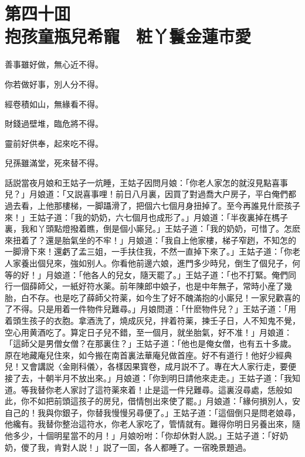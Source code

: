 
\chapter*{第四十囬　\\抱孩童瓶兒希寵　粧丫鬟金蓮市愛}
\thispagestyle{empty}

\begin{myquote}
善事雖好做，無心近不得。

你若做好事，別人分不得。

經卷積如山，無緣看不得。

財錢過壁堆，臨危將不得。

靈前好供奉，起來吃不得。

兒孫雖滿堂，死來替不得。
\end{myquote}

話説當夜月娘和王姑子一炕睡，王姑子因問月娘：「你老人家怎的就沒見點喜事兒？」月娘道：「又説喜事哩！前日八月裏，因買了對過喬大户房子，平白俺們都過去看，上他那樓梯，一脚躡滑了，把個六七個月身扭掉了。至今再誰見什麽孩子來！」王姑子道：「我的奶奶，六七個月也成形了。」月娘道：「半夜裏掉在榪子裏，我和丫頭點燈撥着瞧，倒是個小廝兒。」王姑子道：「我的奶奶，可惜了。怎麽來扭着了？還是胎氣坐的不牢！」月娘道：「我自上他家樓，梯子窄趔，不知怎的一脚滑下來！還虧了孟三姐，一手扶住我，不然一直掉下來了。」王姑子道：「你老人家養出個兒來，強如别人。你看他前邊六娘，進門多少時兒，倒生了個兒子，何等的好！」月娘道：「他各人的兒女，隨天罷了。」王姑子道：「也不打緊。俺們同行一個薛師父，一紙好符水薬。前年陳郎中娘子，也是中年無子，常時小産了幾胎，白不存。也是吃了薛師父符薬，如今生了好不醜滿抱的小廝兒！一家兒歡喜的了不得。只是用着一件物件兒難尋。」月娘問道：「什麽物件兒？」王姑子道：「用着頭生孩子的衣胞。拿酒洗了，燒成灰兒，拌着符薬，揀壬子日，人不知鬼不覺，空心用黄酒吃了。算定日子兒不錯，至一個月，就坐胎氣，好不准！」月娘道：「這師父是男僧女僧？在那裏住？」王姑子道：「他也是俺女僧，也有五十多歲。原在地藏庵兒住來，如今搬在南首裏法華庵兒做首座。好不有道行！他好少經典兒！又會講説〈金剛科儀〉，各樣因果寳卷，成月説不了。專在大人家行走，要便接了去，十朝半月不放出來。」月娘道：「你到明日請他來走走。」王姑子道：「我知道。等我替你老人家討了這符薬來着！止是這一件兒難尋。這裏沒尋處，恁般如此，你不如把前頭這孩子的房兒，借情刨出來使了罷。」月娘道：「緣何損別人，安自己的！我與你銀子，你替我慢慢另尋便了。」王姑子道：「這個倒只是問老娘尋，他纔有。我替你整治這符水，你老人家吃了，管情就有。難得你明日另養出來，隨他多少，十個明星當不的月！」月娘吩咐：「你却休對人説。」王姑子道：「好奶奶，儍了我，肯對人説！」説了一囬，各人都睡了。一宿晚景題過。

